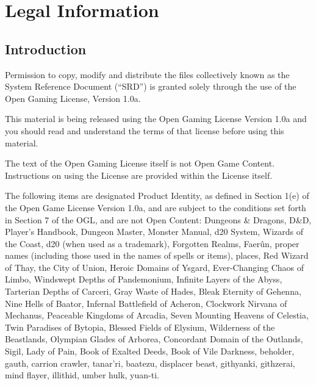 


%

\chapter{Legal Information}

\section{Introduction}

Permission to copy, modify and distribute the files collectively known as the System Reference Document (``SRD'') is granted solely through the use of the Open Gaming License, Version 1.0a.


This material is being released using the Open Gaming License Version 1.0a and you should read and understand the terms of that license before using this material.


The text of the Open Gaming License itself is not Open Game Content. Instructions 
on using the License are provided within the License itself. 


The following items are designated Product Identity, as defined in Section 1(e) of the Open Game License Version 1.0a, and are subject to the conditions set forth in Section 7 of the OGL, and are not Open Content: Dungeons \& Dragons, D\&D, Player's 
Handbook, Dungeon Master, Monster Manual, d20 System, Wizards of the Coast, d20 (when used as a trademark), Forgotten Realms, Faerûn, proper names (including those used in the names of spells or items), places, Red Wizard of Thay, the City of Union, Heroic Domains of Ysgard, Ever-Changing Chaos of Limbo, Windswept Depths of Pandemonium, Infinite Layers of the Abyss, Tarterian Depths of Carceri, Gray Waste of Hades, Bleak Eternity of Gehenna, Nine Hells of Baator, Infernal Battlefield of Acheron, Clockwork Nirvana of Mechanus, Peaceable Kingdoms of Arcadia, Seven Mounting Heavens of Celestia, Twin Paradises of Bytopia, Blessed Fields of Elysium, Wilderness of the Beastlands, Olympian Glades of Arborea, Concordant Domain of the Outlands, Sigil, Lady of Pain, Book of Exalted Deeds, Book of Vile Darkness, beholder, gauth, carrion crawler, tanar'ri, baatezu, displacer beast, githyanki, githzerai, mind flayer, illithid, umber hulk, yuan-ti.


